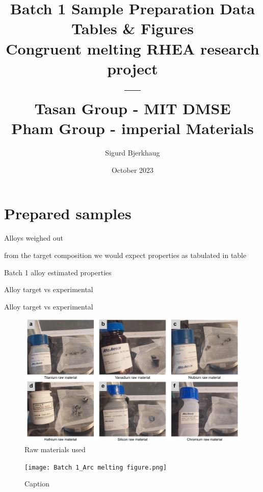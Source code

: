 \documentclass[a4]{article}
\title{Batch 1 Sample Preparation Data Tables \& Figures \\ Congruent melting RHEA research project \\ ---\\Tasan Group - MIT DMSE \\ Pham Group - imperial Materials \\}
\author{Sigurd Bjerkhaug}
\date{October 2023}
\begin{document}
\maketitle

\newpage




\section{Prepared samples}

\begin{table}[h]
    \centering
    \caption{Alloys weighed out}
    
    \label{tab:Batch1 mesured}
\end{table}

from the target composition we would expect properties as tabulated in table
\begin{table}[h]
    \centering
    \caption{Batch 1 alloy estimated properties}
    
    \label{tab:Batch1 mesured}
\end{table}

\begin{table}[h]
    \centering
    \caption{Alloy target vs experimental}
    
    \label{tab:Batch1 mesured}
\end{table}

\begin{table}[h]
    \centering
    \caption{Alloy target vs experimental}
    
    \label{tab:Batch1 mesured}
\end{table}

\begin{figure}
    \centering
    \includegraphics{batch 1 raw materials.jpg}
    \caption{Raw materials used}
    \label{fig:raw-material info}
\end{figure}

\begin{figure}
    \centering
    \texttt{[image: Batch 1\_Arc melting figure.png]}
    \caption{Caption}
    \label{fig:arc-melted samples}
\end{figure}
\end{document}
